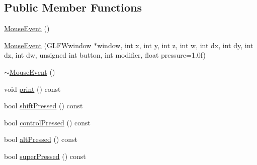 \subsection*{Public Member Functions}
\begin{DoxyCompactItemize}
\item 
\mbox{\hyperlink{structec_1_1_mouse_event_a4a2528518564c73d9b06284c9530b000}{Mouse\+Event}} ()
\item 
\mbox{\hyperlink{structec_1_1_mouse_event_af9aa266623dd0b951176a97969ab11f7}{Mouse\+Event}} (G\+L\+F\+Wwindow $\ast$window, int x, int y, int z, int w, int dx, int dy, int dz, int dw, unsigned int button, int modifier, float pressure=1.\+0f)
\item 
\mbox{\hyperlink{structec_1_1_mouse_event_a1284b01bc0cbece09efe65d2469b7f26}{$\sim$\+Mouse\+Event}} ()
\item 
void \mbox{\hyperlink{structec_1_1_mouse_event_a883d6e7d2378ad2fa0ef47e53161e1ec}{print}} () const
\item 
bool \mbox{\hyperlink{structec_1_1_mouse_event_aa5ceeabab4134dbabebf8e9e9822c47f}{shift\+Pressed}} () const
\item 
bool \mbox{\hyperlink{structec_1_1_mouse_event_a0f3f5f679fe77044c54792634f51c7af}{control\+Pressed}} () const
\item 
bool \mbox{\hyperlink{structec_1_1_mouse_event_a2ba39d134d9ece00227d5d10547c2d29}{alt\+Pressed}} () const
\item 
bool \mbox{\hyperlink{structec_1_1_mouse_event_ae3d285f4dbea2e76cd0f90f814920292}{super\+Pressed}} () const
\end{DoxyCompactItemize}
